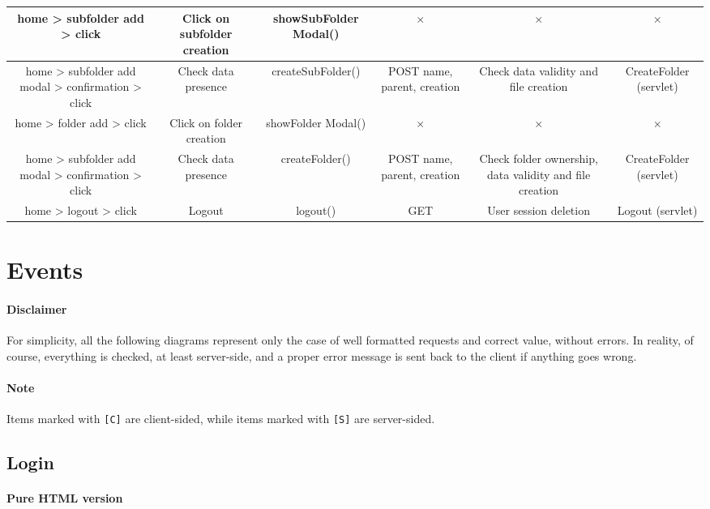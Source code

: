 \documentclass[a4paper, dvipsnames]{article}
\begin{document}
\begin{adjustwidth}{-30pt}{-30pt}
\begin{center}
\begin{tabular}{C|C|C|C|C|C}
				\hline
				home > subfolder add > click & Click on subfolder creation & showSubFolder Modal() & $\times$ & $\times$ & $\times$ \\
				\hline
				home > subfolder add modal > confirmation > click & Check data presence & createSubFolder() & POST name, parent, creation & Check data validity and file creation & CreateFolder (servlet) \\
				\hline
				home > folder add > click & Click on folder creation & showFolder Modal() & $\times$ & $\times$ & $\times$ \\
				\hline
				home > subfolder add modal > confirmation > click & Check data presence & createFolder() & POST name, parent, creation & Check folder ownership, data validity and file creation & CreateFolder (servlet) \\
				\hline
				home > logout > click & Logout & logout() & GET & User session deletion & Logout (servlet)
			\end{tabular}
		\end{center}
	\end{adjustwidth}
	
	\pagebreak
	
	\section{Events}
	
	\paragraph{Disclaimer} For simplicity, all the following diagrams represent only the case of well formatted requests and correct value, without errors. In reality, of course, everything is checked, at least server-side, and a proper error message is sent back to the client if anything goes wrong.
	
	\paragraph{Note} Items marked with \verb|[C]| are client-sided, while items marked with \verb|[S]| are server-sided.
	
	\subsection{Login}
	
	\paragraph{Pure HTML version}
	
\end{document}
